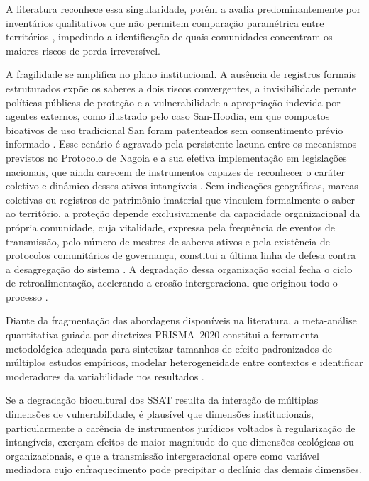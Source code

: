 A literatura reconhece essa singularidade, porém a avalia predominantemente por inventários qualitativos que não permitem comparação paramétrica entre territórios \cite{CalvetMir2016,LaRosa2021,Saiba2023}, impedindo a identificação de quais comunidades concentram os maiores riscos de perda irreversível.

A fragilidade se amplifica no plano institucional. A ausência de registros formais estruturados expõe os saberes a dois riscos convergentes, a invisibilidade perante políticas públicas de proteção \cite{Santilli2009} e a vulnerabilidade a apropriação indevida por agentes externos, como ilustrado pelo caso San-Hoodia, em que compostos bioativos de uso tradicional San foram patenteados sem consentimento prévio informado \cite{Wynberg2015}. Esse cenário é agravado pela persistente lacuna entre os mecanismos previstos no Protocolo de Nagoia e a sua efetiva implementação em legislações nacionais, que ainda carecem de instrumentos capazes de reconhecer o caráter coletivo e dinâmico desses ativos intangíveis \cite{Laird2020}. Sem indicações geográficas, marcas coletivas ou registros de patrimônio imaterial que vinculem formalmente o saber ao território, a proteção depende exclusivamente da capacidade organizacional da própria comunidade, cuja vitalidade, expressa pela frequência de eventos de transmissão, pelo número de mestres de saberes ativos e pela existência de protocolos comunitários de governança, constitui a última linha de defesa contra a desagregação do sistema \cite{FalsBorda1991,Ostrom1990}. A degradação dessa organização social fecha o ciclo de retroalimentação, acelerando a erosão intergeracional que originou todo o processo \cite{Agrawal2002}.

Diante da fragmentação das abordagens disponíveis na literatura, a meta-análise quantitativa guiada por diretrizes PRISMA~2020 constitui a ferramenta metodológica adequada para sintetizar tamanhos de efeito padronizados de múltiplos estudos empíricos, modelar heterogeneidade entre contextos e identificar moderadores da variabilidade nos resultados \cite{Page2021,Borenstein2009,Pustejovsky2022}.

Se a degradação biocultural dos SSAT resulta da interação de múltiplas dimensões de vulnerabilidade, é plausível que dimensões institucionais, particularmente a carência de instrumentos jurídicos voltados à regularização de intangíveis, exerçam efeitos de maior magnitude do que dimensões ecológicas ou organizacionais, e que a transmissão intergeracional opere como variável mediadora cujo enfraquecimento pode precipitar o declínio das demais dimensões.

